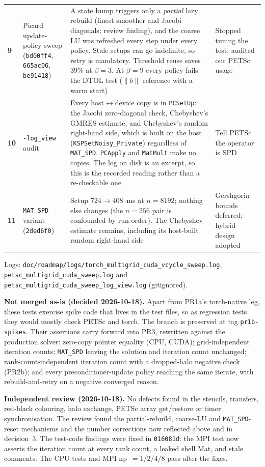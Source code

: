 \documentclass[11pt]{article}
\begin{document}
\begin{longtable}{>{\bfseries}p{} p{} p{} p{}}
9 & Picard update-policy sweep (\texttt{bd00ff4}, \texttt{665ac06}, \texttt{be91418}) & A state bump triggers only a \emph{partial} lazy rebuild (finest smoother and Jacobi diagonals; review finding), and the coarse LU was refreshed every step under every policy. Stale setups can go indefinite, so retry is mandatory. Threshold reuse saves 39\% at $\beta=3$. At $\beta=9$ every policy fails the DTOL test ($\|b\|$ reference with a warm start) & Stopped tuning the test; audited our PETSc usage \\
10 & \texttt{-log\_view} audit & Every host$\leftrightarrow$device copy is in \texttt{PCSetUp}: the Jacobi zero-diagonal check, Chebyshev's GMRES estimate, and Chebyshev's random right-hand side, which is built on the host (\texttt{KSPSetNoisy\_Private}) regardless of \texttt{MAT\_SPD}. \texttt{PCApply} and \texttt{MatMult} make no copies. The log on disk is an excerpt, so this is the recorded reading rather than a re-checkable one & Tell PETSc the operator is SPD \\
11 & \texttt{MAT\_SPD} variant (\texttt{2ded6f0}) & Setup 724$\to$408~ms at $n=8192$; nothing else changes (the $n=256$ pair is confounded by run order). The Chebyshev estimate remains, including its host-built random right-hand side & Gershgorin bounds deferred; hybrid design adopted \\
\bottomrule
\end{longtable}

Logs: \texttt{doc/roadmap/logs/torch\_multigrid\_cuda\_vcycle\_sweep.log},
\texttt{petsc\_multigrid\_cuda\_sweep.log} and
\texttt{petsc\_multigrid\_cuda\_sweep\_log\_view.log} (gitignored).

\textbf{Not merged as-is (decided 2026-10-18).} Apart from PR1a's
torch-native leg, these tests exercise spike code that lives in the test
files, so as regression tests they would mostly check PETSc and torch. The
branch is preserved at tag \texttt{pr1b-spikes}. Their assertions carry
forward into PR3, rewritten against the production solver: zero-copy
pointer equality (CPU, CUDA); grid-independent iteration counts;
\texttt{MAT\_SPD} leaving the solution and iteration count unchanged;
rank-count-independent iteration count with a dropped-halo negative check
(PR2b); and every preconditioner-update policy reaching the same iterate,
with rebuild-and-retry on a negative converged reason.

\textbf{Independent review (2026-10-18).} No defects found in the stencils,
transfers, red-black colouring, halo exchange, PETSc array get/restore or
timer synchronisation. The review found the partial-rebuild, coarse-LU and
\texttt{MAT\_SPD}-reset mechanisms and the number corrections now reflected
above and in decision~3. The test-code findings were fixed in
\texttt{016081d}: the MPI test now asserts the iteration count at every
rank count, a leaked shell Mat, and stale comments. The CPU tests and MPI
np~$=1/2/4/8$ pass after the fixes.
\end{document}
